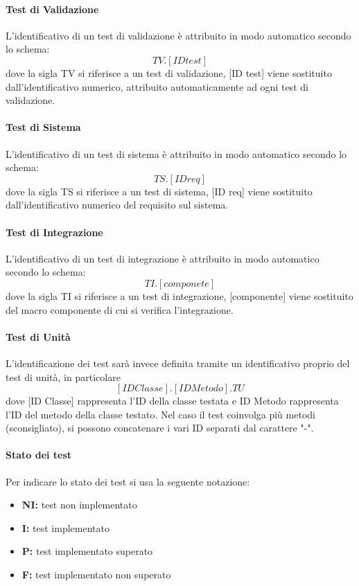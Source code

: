 \documentclass[12pt,a4paper]{article}
\begin{document}
	\paragraph{Test di Validazione}
	L'identificativo di un test di validazione è attribuito in modo automatico secondo lo schema:
	\[ TV.[ID test ]\]
	dove la sigla TV si riferisce a un test di validazione, [ID test] viene sostituito dall'identificativo numerico, attribuito automaticamente ad ogni test di validazione.
		
	\paragraph{Test di Sistema}
	L'identificativo di un test di sistema è attribuito in modo automatico secondo lo schema:
	\[ TS.[ID req]\]
	dove la sigla TS si riferisce a un test di sistema, [ID req] viene sostituito dall'identificativo numerico del requisito sul sistema.
	 
	\paragraph{Test di Integrazione}
	L'identificativo di un test di integrazione è attribuito in modo automatico secondo lo schema:
	\[ TI.[componete]\]
	dove la sigla TI si riferisce a un test di integrazione, [componente] viene sostituito del macro componente di cui si verifica l'integrazione.
	
	\paragraph{Test di Unità}
L'identificazione dei test sarà invece definita tramite un identificativo proprio del test di unità, in particolare
	\[ [ID Classe].[ID Metodo].TU \] 
	dove [ID Classe] rappresenta l'ID della classe testata e ID Metodo rappresenta l'ID del metodo della classe testato.
	 Nel caso il test coinvolga più metodi (sconsigliato), si possono concatenare i vari ID separati dal carattere "-".
	
	\paragraph{Stato dei test}
	Per indicare lo stato dei test si usa la seguente notazione:

	\begin{itemize}
		\item \textbf{NI:} test non implementato
		\item \textbf{I:} test implementato
		\item \textbf{P:} test implementato superato
		\item \textbf{F:} test implementato non superato
	\end{itemize}
		
\end{document}
